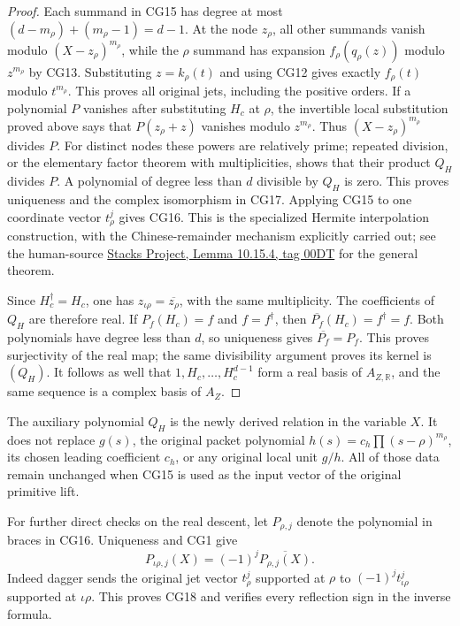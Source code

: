 \begin{proof}
Each summand in CG15 has degree at most
$(d-m_\rho)+(m_\rho-1)=d-1$.
At the node $z_\rho$, all other summands vanish modulo
$(X-z_\rho)^{m_\rho}$, while the $\rho$ summand has expansion
$f_\rho(q_\rho(z))$ modulo $z^{m_\rho}$ by CG13.
Substituting $z=k_\rho(t)$ and using CG12 gives exactly
$f_\rho(t)$ modulo $t^{m_\rho}$. This proves all original jets,
including the positive orders.
If a polynomial $P$ vanishes after substituting $H_c$ at $\rho$,
the invertible local substitution proved above says that
$P(z_\rho+z)$ vanishes modulo $z^{m_\rho}$.
Thus $(X-z_\rho)^{m_\rho}$ divides $P$.
For distinct nodes these powers are relatively prime; repeated
division, or the elementary factor theorem with multiplicities,
shows that their product $Q_H$ divides $P$.
A polynomial of degree less than $d$ divisible by $Q_H$ is zero.
This proves uniqueness and the complex isomorphism in CG17.
Applying CG15 to one coordinate vector $t_\rho^j$ gives CG16.
This is the specialized Hermite interpolation construction, with
the Chinese-remainder mechanism explicitly carried out; see the human-source
\href{https://stacks.math.columbia.edu/tag/00DT}{Stacks Project,
Lemma 10.15.4, tag 00DT} for the general theorem.

Since $H_c^\dagger=H_c$, one has
$z_{\iota\rho}=\overline{z_\rho}$, with the same multiplicity.
The coefficients of $Q_H$ are therefore real. If $P_f(H_c)=f$
and $f=f^\dagger$, then
$\overline{P_f}(H_c)=f^\dagger=f$.
Both polynomials have degree less than $d$, so uniqueness gives
$\overline{P_f}=P_f$. This proves surjectivity of the real map;
the same divisibility argument proves its kernel is $(Q_H)$.
It follows as well that $1,H_c,\ldots,H_c^{d-1}$ form a real
basis of $A_{Z,\mathbb{R}}$, and the same sequence is a complex
basis of $A_Z$.
\end{proof}

The auxiliary polynomial $Q_H$ is the newly derived relation in
the variable $X$. It does not replace $g(s)$, the original packet
polynomial $h(s)=c_h\prod(s-\rho)^{m_\rho}$, its chosen leading
coefficient $c_h$, or any original local unit $g/h$.
All of those data remain unchanged when CG15 is used as the
input vector of the original primitive lift.

For further direct checks on the real descent, let
$P_{\rho,j}$ denote the polynomial in braces in CG16.
Uniqueness and CG1 give
\begin{equation}
 P_{\iota\rho,j}(X)=(-1)^j\overline{P_{\rho,j}(X)}.
 \tag{CG18}\label{cg:paired-inverse}
\end{equation}
Indeed dagger sends the original jet vector $t_\rho^j$ supported
at $\rho$ to $(-1)^j t_{\iota\rho}^j$ supported at $\iota\rho$.
This proves CG18 and verifies every reflection sign in the
inverse formula.

